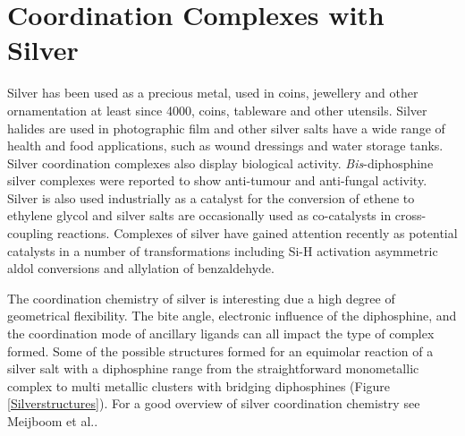 
\chapter{Coordination Complexes with Silver}
\label{ch:silver}

Silver has been used as a precious metal, used in coins, jewellery and other ornamentation at least since 4000\BC, coins, tableware and other utensils.  Silver halides are used in photographic film and other silver salts have a wide range of health and food applications, such as wound dressings and water storage tanks.\cite{Enghag2004Ag}  Silver coordination complexes also display biological activity.  \emph{Bis}-diphosphine silver complexes were reported to show anti-tumour and anti-fungal activity.\cite{Berners-Price1988, Liu2008}  Silver is also used industrially as a catalyst for the conversion of ethene to ethylene glycol and silver salts are occasionally used as co-catalysts in cross-coupling reactions.\cite{Suzuki1999}  Complexes of silver have gained attention recently as potential catalysts in a number of transformations including Si-H activation\cite{Iglesias2012} asymmetric aldol conversions \cite{Sawamura1990} and allylation of benzaldehyde\cite{Malaise2006, Yanagisawa1999}.




The coordination chemistry of silver is interesting due a high degree of geometrical flexibility. The bite angle, electronic influence of the diphosphine, and the coordination mode of ancillary ligands can all impact the type of complex formed.  Some of the possible structures formed for an equimolar reaction of a silver salt with a diphosphine range from the straightforward monometallic complex to multi metallic clusters with bridging diphosphines (Figure \ref{Silverstructures}).  For a good overview of silver coordination chemistry see Meijboom et al.\cite{Meijboom2009}.  

